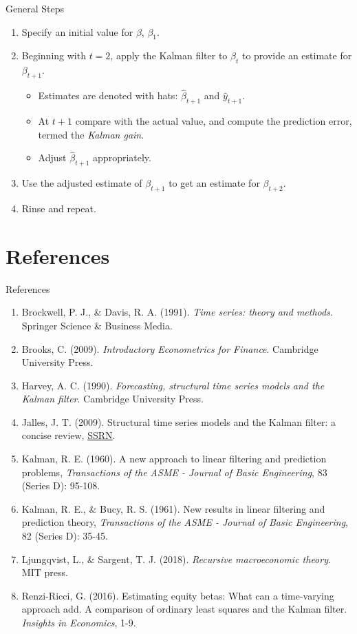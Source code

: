 \documentclass[dvipsnames,mathserif]{beamer}
\begin{document}
{\begin{frame}{General Steps}
	\begin{enumerate}
		\item Specify an initial value for $\beta$, $\beta_1$. 
		\item Beginning with $t = 2$, apply the Kalman filter to $\beta_t$ to provide an estimate for $\beta_{t+1}$. 
		\begin{itemize}
			\item Estimates are denoted with hats: $\widehat{\beta}_{t+1}$ and $\widehat{y}_{t+1}$.
			\item At $t+1$ compare with the actual value, and compute the prediction error, termed the \textit{Kalman gain}.
			\item Adjust $\hat{\beta}_{t+1}$ appropriately.
		\end{itemize}
		\item Use the adjusted estimate of $\beta_{t+1}$ to get an estimate for $\beta_{t+2}$.
		\item Rinse and repeat.
	\end{enumerate}
\end{frame}

\section{References}

\begin{frame}{References}
	\begin{enumerate}
	\tiny
		\item Brockwell, P. J., \& Davis, R. A. (1991). \textit{Time series: theory and methods}. Springer Science \& Business Media.
		\item Brooks, C. (2009). \textit{Introductory Econometrics for Finance}. Cambridge University Press.
		\item Harvey, A. C. (1990). \textit{Forecasting, structural time series models and the Kalman filter}. Cambridge University Press.
		\item Jalles, J. T. (2009). Structural time series models and the Kalman filter: a concise review, \href{https://papers.ssrn.com/sol3/papers.cfm?abstract_id=1496864}{SSRN}.
		\item Kalman, R. E. (1960). A new approach to linear filtering and prediction problems, \textit{Transactions of the ASME - Journal of Basic Engineering}, 83 (Series D): 95-108. 
		\item Kalman, R. E., \& Bucy, R. S. (1961). New results in linear filtering and prediction theory, \textit{Transactions of the ASME - Journal of Basic Engineering}, 82 (Series D): 35-45. 
		\item Ljungqvist, L., \& Sargent, T. J. (2018). \textit{Recursive macroeconomic theory}. MIT press.
		\item Renzi-Ricci, G. (2016). Estimating equity betas: What can a time-varying approach add. A comparison of ordinary least squares and the Kalman filter. \textit{Insights in Economics}, 1-9.
	\end{enumerate}
\end{frame}

}
\end{document}
